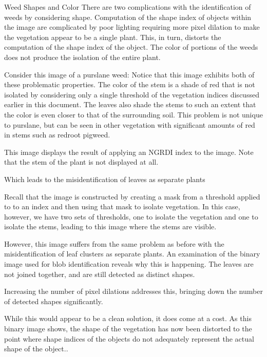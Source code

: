 \documentclass[letterpaper]{article}
\begin{document}
Weed Shapes and Color
There are two complications with the identification of weeds by considering shape.  Computation of the shape index of objects within the image are complicated by poor lighting requiring more pixel dilation to make the vegetation appear to be a single plant. This, in turn, distorts the computation of the shape index of the object. The color of portions of the weeds does not produce the isolation of the entire plant.

Consider this image of a purslane weed:
Notice that this image exhibits both of these problematic properties. The color of the stem is a shade of red that is not isolated by considering only a single threshold of the vegetation indices discussed earlier in this document. The leaves also shade the stems to such an extent that the color is even closer to that of the surrounding soil. This problem is not unique to purslane, but can be seen in other vegetation with significant amounts of red in stems such as redroot pigweed.




This image displays the result of applying an NGRDI index to the image. Note that the stem of the plant is not displayed at all.


Which leads to the misidentification of leaves as separate plants



Recall that the image is constructed by creating a mask from a threshold applied to to an index and then using that mask to isolate vegetation. In this case, however, we have two sets of thresholds, one to isolate the vegetation and one to isolate the stems, leading to this image where the stems are visible.



However, this image suffers from the same problem as before with the misidentification of leaf clusters as separate plants.  An examination of the binary image used for blob identification reveals why this is happening.   The leaves are not joined together, and are still detected as distinct shapes.




Increasing the number of pixel dilations addresses this, bringing down the number of detected shapes significantly.


While this would appear to be a clean solution, it does come at a cost. As this binary image shows, the shape of the vegetation has now been distorted to the point where shape indices of the objects do not adequately represent the actual shape of the object..
\end{document}
